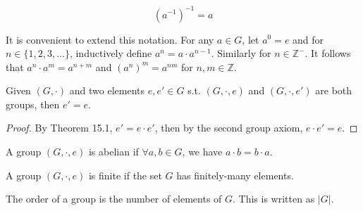 \documentclass[a4paper]{article}
\begin{document}
\begin{cor}
$$(a^{-1})^{-1}=a$$
\end{cor}
It is convenient to extend this notation. For any $a\in G$, let $a^0=e$ and for $n\in\{1,2,3,...\}$, inductively define $a^n=a\cdot a^{n-1}$. Similarly for $n\in\mathbb{Z}^-$. It follows that $a^n\cdot a^m=a^{n+m}$ and $(a^n)^m=a^{nm}$ for $n,m\in\mathbb{Z}$.
\begin{cor}
Given $(G,\cdot)$ and two elements $e,e'\in G$ s.t. $(G,\cdot,e)$ and $(G,\cdot,e')$ are both groups, then $e'=e$.
\end{cor}
\begin{proof}
By Theorem 15.1, $e'=e\cdot e'$, then by the second group axiom, $e\cdot e'=e$.
\end{proof}
\begin{defi}[Abelian]
A group $(G,\cdot,e)$ is abelian if $\forall a,b\in G$, we have $a\cdot b=b\cdot a$.
\end{defi}
\begin{defi}[Finite]
A group $(G,\cdot,e)$ is finite if the set $G$ has finitely-many elements.
\end{defi}
\begin{defi}[Order]
The order of a group is the number of elements of $G$. This is written as $|G|$.
\end{defi}
\newpage
\end{document}
